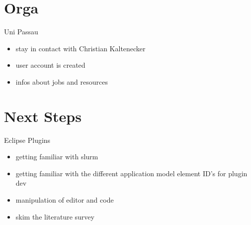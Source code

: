 \documentclass[11pt,aspectratio=169]{beamer}
\begin{document}
\section{Orga}

\begin{frame}{Uni Passau}
  \begin{itemize}
    \item stay in contact with Christian Kaltenecker
    \item user account is created
    \item infos about jobs and resources

  \end{itemize}
\end{frame}

\section{Next Steps}

\begin{frame}{Eclipse Plugins}
  \begin{itemize}
    \item getting familiar with slurm
    \item getting familiar with the different application model element ID's for plugin dev
    \item manipulation of editor and code
    \item skim the literature survey
  \end{itemize}
\end{frame}


\appendix
\end{document}
